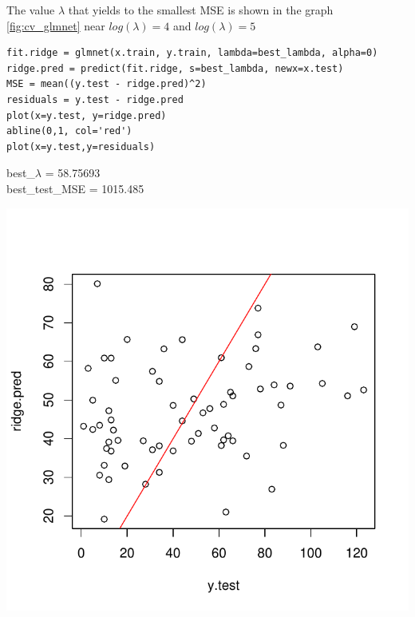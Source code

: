 \documentclass[]{report}
\begin{document}
The value $\lambda$ that yields to the smallest MSE is shown in the graph \ref{fig:cv_glmnet} near $log(\lambda)=4$ and $log(\lambda)=5 $


\begin{lstlisting}
fit.ridge = glmnet(x.train, y.train, lambda=best_lambda, alpha=0)
ridge.pred = predict(fit.ridge, s=best_lambda, newx=x.test)
MSE = mean((y.test - ridge.pred)^2)
residuals = y.test - ridge.pred
plot(x=y.test, y=ridge.pred)
abline(0,1, col='red')
plot(x=y.test,y=residuals)
\end{lstlisting}

\begin{center} 
	best\_$\lambda$ = 58.75693 \\
	best\_test\_MSE = 1015.485
\end{center} 

\begin{center}
	\includegraphics[width=0.8\linewidth]{Figures/ridge_yhat.pdf}
	\label{fig:ridhe_yhat}
\end{center}
\end{document}
